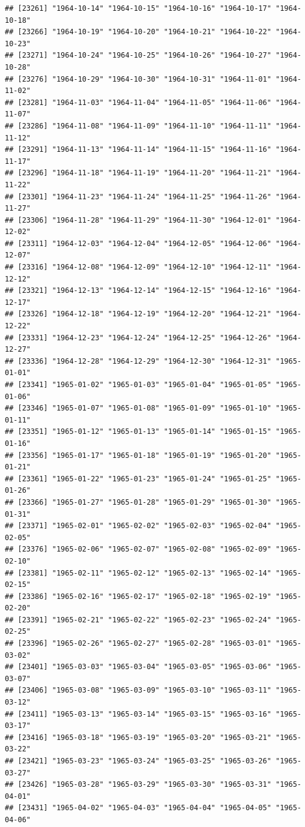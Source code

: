 \documentclass{article}\usepackage[]{graphicx}\usepackage[]{color}
\makeatletter
\newenvironment{kframe}{%
 \def\at@end@of@kframe{}%
 \ifinner\ifhmode%
  \def\at@end@of@kframe{\end{minipage}}%
  \begin{minipage}{\columnwidth}%
 \fi\fi%
 \def\FrameCommand##1{\hskip\@totalleftmargin \hskip-\fboxsep
 \colorbox{shadecolor}{##1}\hskip-\fboxsep
     \hskip-\linewidth \hskip-\@totalleftmargin \hskip\columnwidth}%
 \MakeFramed {\advance\hsize-\width
   \@totalleftmargin\z@ \linewidth\hsize
   \@setminipage}}%
 {\par\unskip\endMakeFramed%
 \at@end@of@kframe}
\newenvironment{knitrout}{}{} %
\makeatother
\begin{document}
\begin{description}
\begin{knitrout}
\begin{kframe}
\begin{verbatim}
## [23261] "1964-10-14" "1964-10-15" "1964-10-16" "1964-10-17" "1964-10-18"
## [23266] "1964-10-19" "1964-10-20" "1964-10-21" "1964-10-22" "1964-10-23"
## [23271] "1964-10-24" "1964-10-25" "1964-10-26" "1964-10-27" "1964-10-28"
## [23276] "1964-10-29" "1964-10-30" "1964-10-31" "1964-11-01" "1964-11-02"
## [23281] "1964-11-03" "1964-11-04" "1964-11-05" "1964-11-06" "1964-11-07"
## [23286] "1964-11-08" "1964-11-09" "1964-11-10" "1964-11-11" "1964-11-12"
## [23291] "1964-11-13" "1964-11-14" "1964-11-15" "1964-11-16" "1964-11-17"
## [23296] "1964-11-18" "1964-11-19" "1964-11-20" "1964-11-21" "1964-11-22"
## [23301] "1964-11-23" "1964-11-24" "1964-11-25" "1964-11-26" "1964-11-27"
## [23306] "1964-11-28" "1964-11-29" "1964-11-30" "1964-12-01" "1964-12-02"
## [23311] "1964-12-03" "1964-12-04" "1964-12-05" "1964-12-06" "1964-12-07"
## [23316] "1964-12-08" "1964-12-09" "1964-12-10" "1964-12-11" "1964-12-12"
## [23321] "1964-12-13" "1964-12-14" "1964-12-15" "1964-12-16" "1964-12-17"
## [23326] "1964-12-18" "1964-12-19" "1964-12-20" "1964-12-21" "1964-12-22"
## [23331] "1964-12-23" "1964-12-24" "1964-12-25" "1964-12-26" "1964-12-27"
## [23336] "1964-12-28" "1964-12-29" "1964-12-30" "1964-12-31" "1965-01-01"
## [23341] "1965-01-02" "1965-01-03" "1965-01-04" "1965-01-05" "1965-01-06"
## [23346] "1965-01-07" "1965-01-08" "1965-01-09" "1965-01-10" "1965-01-11"
## [23351] "1965-01-12" "1965-01-13" "1965-01-14" "1965-01-15" "1965-01-16"
## [23356] "1965-01-17" "1965-01-18" "1965-01-19" "1965-01-20" "1965-01-21"
## [23361] "1965-01-22" "1965-01-23" "1965-01-24" "1965-01-25" "1965-01-26"
## [23366] "1965-01-27" "1965-01-28" "1965-01-29" "1965-01-30" "1965-01-31"
## [23371] "1965-02-01" "1965-02-02" "1965-02-03" "1965-02-04" "1965-02-05"
## [23376] "1965-02-06" "1965-02-07" "1965-02-08" "1965-02-09" "1965-02-10"
## [23381] "1965-02-11" "1965-02-12" "1965-02-13" "1965-02-14" "1965-02-15"
## [23386] "1965-02-16" "1965-02-17" "1965-02-18" "1965-02-19" "1965-02-20"
## [23391] "1965-02-21" "1965-02-22" "1965-02-23" "1965-02-24" "1965-02-25"
## [23396] "1965-02-26" "1965-02-27" "1965-02-28" "1965-03-01" "1965-03-02"
## [23401] "1965-03-03" "1965-03-04" "1965-03-05" "1965-03-06" "1965-03-07"
## [23406] "1965-03-08" "1965-03-09" "1965-03-10" "1965-03-11" "1965-03-12"
## [23411] "1965-03-13" "1965-03-14" "1965-03-15" "1965-03-16" "1965-03-17"
## [23416] "1965-03-18" "1965-03-19" "1965-03-20" "1965-03-21" "1965-03-22"
## [23421] "1965-03-23" "1965-03-24" "1965-03-25" "1965-03-26" "1965-03-27"
## [23426] "1965-03-28" "1965-03-29" "1965-03-30" "1965-03-31" "1965-04-01"
## [23431] "1965-04-02" "1965-04-03" "1965-04-04" "1965-04-05" "1965-04-06"

\end{verbatim}
\end{kframe}
\end{knitrout}
\end{description}
\end{document}
